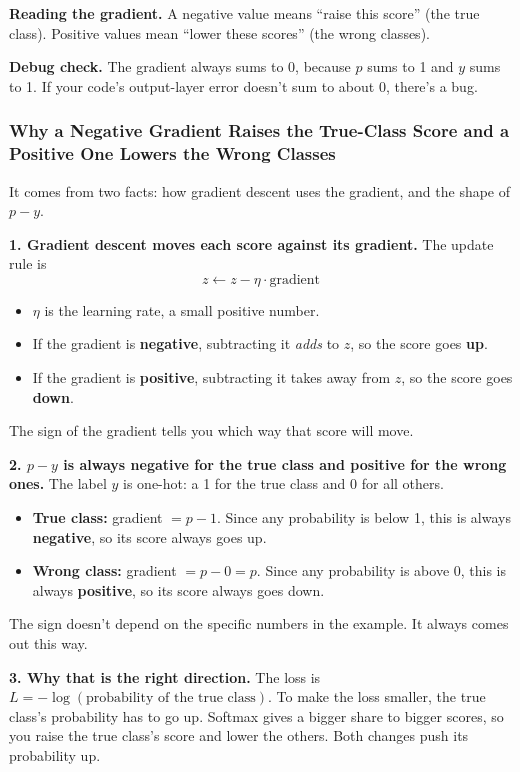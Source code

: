 \textbf{Reading the gradient.} A negative value means ``raise this score'' (the true class). Positive values mean ``lower these scores'' (the wrong classes).

\textbf{Debug check.} The gradient always sums to 0, because $p$ sums to 1 and $y$ sums to 1. If your code's output-layer error doesn't sum to about 0, there's a bug.

\subsubsection*{Why a Negative Gradient Raises the True-Class Score and a Positive One Lowers the Wrong Classes}

It comes from two facts: how gradient descent uses the gradient, and the shape of $p - y$.

\textbf{1. Gradient descent moves each score against its gradient.} The update rule is
\[
z \leftarrow z - \eta \cdot \text{gradient}
\]
\begin{itemize}
  \item $\eta$ is the learning rate, a small positive number.
  \item If the gradient is \textbf{negative}, subtracting it \emph{adds} to $z$, so the score goes \textbf{up}.
  \item If the gradient is \textbf{positive}, subtracting it takes away from $z$, so the score goes \textbf{down}.
\end{itemize}
The sign of the gradient tells you which way that score will move.

\textbf{2. $p - y$ is always negative for the true class and positive for the wrong ones.} The label $y$ is one-hot: a 1 for the true class and 0 for all others.
\begin{itemize}
  \item \textbf{True class:} gradient $= p - 1$. Since any probability is below 1, this is always \textbf{negative}, so its score always goes up.
  \item \textbf{Wrong class:} gradient $= p - 0 = p$. Since any probability is above 0, this is always \textbf{positive}, so its score always goes down.
\end{itemize}
The sign doesn't depend on the specific numbers in the example. It always comes out this way.

\textbf{3. Why that is the right direction.} The loss is $L = -\log(\text{probability of the true class})$. To make the loss smaller, the true class's probability has to go up. Softmax gives a bigger share to bigger scores, so you raise the true class's score and lower the others. Both changes push its probability up.

